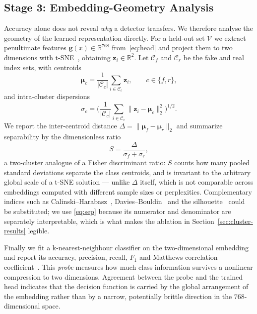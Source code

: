 \documentclass[10pt,journal]{IEEEtran}
\newcommand{\vect}[1]{\boldsymbol{#1}}
\newcommand{\real}{\mathbb{R}}
\begin{document}
\subsection{Stage 3: Embedding-Geometry Analysis}\label{sec:cluster-method}
Accuracy alone does not reveal \emph{why} a detector transfers. We therefore
analyse the geometry of the learned representation directly. For a held-out
set $\mathcal{V}$ we extract penultimate features $\vect{g}(x)\in\real^{768}$
from~\eqref{eq:head} and project them to two dimensions with
t-SNE~\cite{maaten2008tsne}, obtaining $\vect{z}_i\in\real^2$. Let
$\mathcal{C}_f$ and $\mathcal{C}_r$ be the fake and real index sets, with
centroids
\begin{equation}
\vect{\mu}_c=\frac{1}{|\mathcal{C}_c|}\sum_{i\in\mathcal{C}_c}\vect{z}_i,
\qquad c\in\{f,r\},
\end{equation}
and intra-cluster dispersions
\begin{equation}
\sigma_c=\Bigg(\frac{1}{|\mathcal{C}_c|}
  \sum_{i\in\mathcal{C}_c}\big\lVert\vect{z}_i-\vect{\mu}_c\big\rVert_2^2
  \Bigg)^{\!1/2}.
\end{equation}
We report the inter-centroid distance
$\Delta=\lVert\vect{\mu}_f-\vect{\mu}_r\rVert_2$ and summarize separability by
the dimensionless ratio
\begin{equation}
S=\frac{\Delta}{\sigma_f+\sigma_r},
\label{eq:sep}
\end{equation}
a two-cluster analogue of a Fisher discriminant ratio: $S$ counts how many
pooled standard deviations separate the class centroids, and is invariant to
the arbitrary global scale of a t-SNE solution --- unlike $\Delta$ itself,
which is not comparable across embeddings computed with different sample sizes
or perplexities. Complementary indices such as
Calinski--Harabasz~\cite{calinski1974index},
Davies--Bouldin~\cite{davies1979index} and the
silhouette~\cite{rousseeuw1987silhouette} could be substituted; we use
\eqref{eq:sep} because its numerator and denominator are separately
interpretable, which is what makes the ablation in
Section~\ref{sec:cluster-results} legible.

Finally we fit a k-nearest-neighbour classifier on the two-dimensional
embedding and report its accuracy, precision, recall, $F_1$ and Matthews
correlation coefficient~\cite{matthews1975mcc}. This \emph{probe} measures how
much class information survives a nonlinear compression to two dimensions.
Agreement between the probe and the trained head indicates that the decision
function is carried by the global arrangement of the embedding rather than by
a narrow, potentially brittle direction in the $768$-dimensional space.
\end{document}
